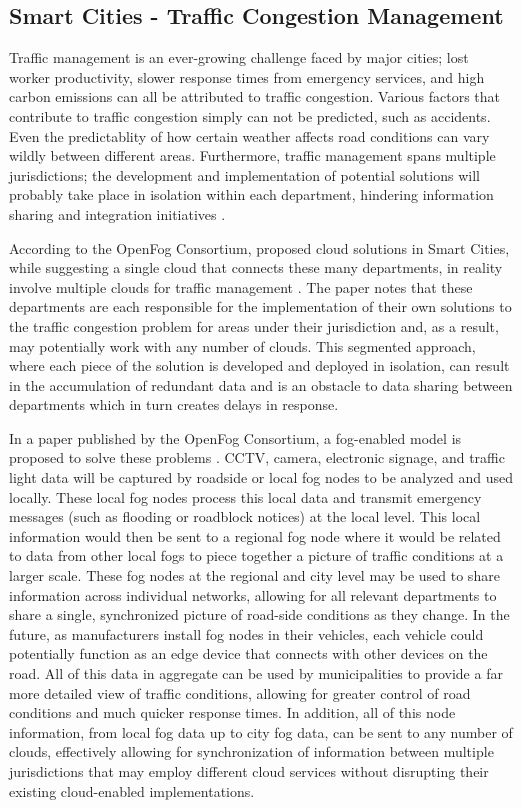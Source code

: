 \documentclass{article}
\begin{document}
\subsection{Smart Cities - Traffic Congestion Management}
Traffic management is an ever-growing challenge faced by major cities; lost worker productivity, slower response times from emergency services, and high carbon emissions can all be attributed to traffic congestion. Various factors that contribute to traffic congestion simply can not be predicted, such as accidents. Even the predictablity of how certain weather affects road conditions can vary wildly between different areas. Furthermore, traffic management spans multiple jurisdictions; the development and implementation of potential solutions will probably take place in isolation within each department, hindering information sharing and integration initiatives \cite{openfogconsortium2017trafficmanagement}.

According to the OpenFog Consortium, proposed cloud solutions in Smart Cities, while suggesting a single cloud that connects these many departments, in reality involve multiple clouds for traffic management \cite{openfogconsortium2017trafficmanagement}. The paper notes that these departments are each responsible for the implementation of their own solutions to the traffic congestion problem for areas under their jurisdiction and, as a result, may potentially work with any number of clouds. This segmented approach, where each piece of the solution is developed and deployed in isolation, can result in the accumulation of redundant data and is an obstacle to data sharing between departments which in turn creates delays in response.

In a paper published by the OpenFog Consortium, a fog-enabled model is proposed to solve these problems \cite{openfogconsortium2017trafficmanagement}. CCTV, camera, electronic signage, and traffic light data will be captured by roadside or local fog nodes to be analyzed and used locally. These local fog nodes process this local data and transmit emergency messages (such as flooding or roadblock notices) at the local level. This local information would then be sent to a regional fog node where it would be related to data from other local fogs to piece together a picture of traffic conditions at a larger scale. These fog nodes at the regional and city level may be used to share information across individual networks, allowing for all relevant departments to share a single, synchronized picture of road-side conditions as they change. In the future, as manufacturers install fog nodes in their vehicles, each vehicle could potentially function as an edge device that connects with other devices on the road. All of this data in aggregate can be used by municipalities to provide a far more detailed view of traffic conditions, allowing for greater control of road conditions and much quicker response times. In addition, all of this node information, from local fog data up to city fog data, can be sent to any number of clouds, effectively allowing for synchronization of information between multiple jurisdictions that may employ different cloud services without disrupting their existing cloud-enabled implementations.

\pagebreak

\renewcommand{\refname}{\section{References}}


\end{document}
